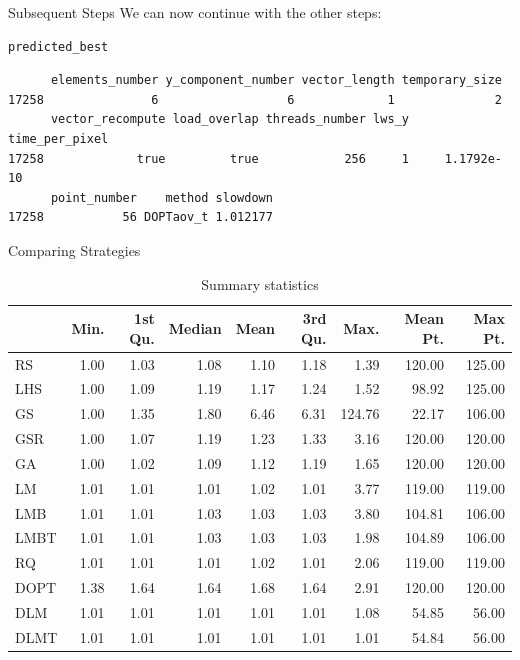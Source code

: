 \documentclass[10pt, compress, aspectratio=169, xcolor={table,usenames,dvipsnames}]{beamer}
\begin{document}
\begin{frame}[fragile,label={sec:org99a2ed0}]{Subsequent Steps}
 We can now \alert{continue} with the \alert{other steps}:
\scriptsize
\lstset{language=r,label= ,caption= ,captionpos=b,numbers=none}
\begin{lstlisting}
predicted_best
\end{lstlisting}

\begin{verbatim}
      elements_number y_component_number vector_length temporary_size
17258               6                  6             1              2
      vector_recompute load_overlap threads_number lws_y time_per_pixel
17258             true         true            256     1     1.1792e-10
      point_number    method slowdown
17258           56 DOPTaov_t 1.012177
\end{verbatim}

\normalsize
\end{frame}

\begin{frame}[label={sec:org51010a1}]{Comparing Strategies}
\begin{table}[ht]
\centering
\begingroup\small
\begin{tabular}{lrrrrrrrr}
  \hline
 & Min. & 1st Qu. & Median & Mean & 3rd Qu. & Max. & Mean Pt. & Max Pt. \\
  \hline
RS & 1.00 & 1.03 & 1.08 & 1.10 & 1.18 & 1.39 & 120.00 & 125.00 \\
  LHS & 1.00 & 1.09 & 1.19 & 1.17 & 1.24 & 1.52 & 98.92 & 125.00 \\
  GS & 1.00 & 1.35 & 1.80 & 6.46 & 6.31 & 124.76 & 22.17 & 106.00 \\
  GSR & 1.00 & 1.07 & 1.19 & 1.23 & 1.33 & 3.16 & 120.00 & 120.00 \\
  GA & 1.00 & 1.02 & 1.09 & 1.12 & 1.19 & 1.65 & 120.00 & 120.00 \\
  LM & 1.01 & 1.01 & 1.01 & 1.02 & 1.01 & 3.77 & 119.00 & 119.00 \\
  LMB & 1.01 & 1.01 & 1.03 & 1.03 & 1.03 & 3.80 & 104.81 & 106.00 \\
  LMBT & 1.01 & 1.01 & 1.03 & 1.03 & 1.03 & 1.98 & 104.89 & 106.00 \\
  RQ & 1.01 & 1.01 & 1.01 & 1.02 & 1.01 & 2.06 & 119.00 & 119.00 \\
  DOPT & 1.38 & 1.64 & 1.64 & 1.68 & 1.64 & 2.91 & 120.00 & 120.00 \\
  DLM & 1.01 & 1.01 & 1.01 & 1.01 & 1.01 & 1.08 & 54.85 & 56.00 \\
  DLMT & 1.01 & 1.01 & 1.01 & 1.01 & 1.01 & 1.01 & 54.84 & 56.00 \\
   \hline
\end{tabular}
\endgroup
\caption{Summary statistics}
\end{table}
\end{frame}
\maketitle
\end{document}
